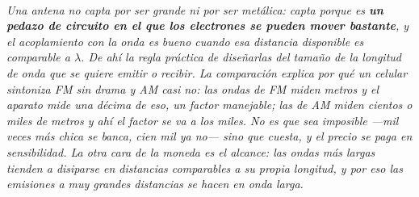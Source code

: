 \begin{center}
\begin{tikzpicture}[scale=0.95, transform shape]
\end{tikzpicture}\\[0.5em]
{\small\itshape Una antena no capta por ser grande ni por ser metálica: capta
porque es \textbf{un pedazo de circuito en el que los electrones se pueden mover
bastante}, y el acoplamiento con la onda es bueno cuando esa distancia
disponible es comparable a $\lambda$. De ahí la regla práctica de diseñarlas del
tamaño de la longitud de onda que se quiere emitir o recibir. La comparación
explica por qué un celular sintoniza FM sin drama y AM casi no: las ondas de FM
miden metros y el aparato mide una décima de eso, un factor manejable; las de AM
miden cientos o miles de metros y ahí el factor se va a los miles. No es que sea
imposible ---mil veces más chica se banca, cien mil ya no--- sino que
\emph{cuesta}, y el precio se paga en sensibilidad. La otra cara de la moneda es
el alcance: las ondas más largas tienden a disiparse en distancias comparables a
su propia longitud, y por eso las emisiones a muy grandes distancias se hacen en
onda larga.}
\end{center}
